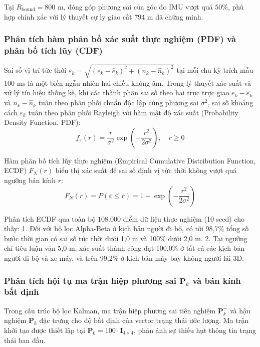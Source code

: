 Tại $R_{\text{bound}} = 800$ m, đóng góp phương sai của góc đo IMU vượt quá 50\%, phù hợp chính xác với lý thuyết cự ly giao cắt 794 m đã chứng minh.

\subsubsection{Phân tích hàm phân bố xác suất thực nghiệm (PDF) và phân bố tích lũy (CDF)}

\hspace{0.5cm} Sai số vị trí tức thời $\varepsilon_k = \sqrt{(e_k - \hat{e}_k)^2 + (n_k - \hat{n}_k)^2}$ tại mỗi chu kỳ trích mẫu 100 ms là một biến ngẫu nhiên hai chiều không âm. Trong lý thuyết xác suất và xử lý tín hiệu thống kê, khi các thành phần sai số theo hai trục trực giao $e_k - \hat{e}_k$ và $n_k - \hat{n}_k$ tuân theo phân phối chuẩn độc lập cùng phương sai $\sigma^2$, sai số khoảng cách $\varepsilon_k$ tuân theo phân phối Rayleigh với hàm mật độ xác suất (Probability Density Function, PDF):
\begin{equation}
f_{\varepsilon}(r) = \frac{r}{\sigma^2} \exp\left(-\frac{r^2}{2\sigma^2}\right), \quad r \ge 0
\label{eq:rayleigh-pdf}
\end{equation}

Hàm phân bố tích lũy thực nghiệm (Empirical Cumulative Distribution Function, ECDF) $F_N(r)$ biểu thị xác suất để sai số định vị tức thời không vượt quá ngưỡng bán kính $r$:
\begin{equation}
F_N(r) = P(\varepsilon \le r) = 1 - \exp\left(-\frac{r^2}{2\sigma^2}\right)
\label{eq:ecdf-formula}
\end{equation}

Phân tích ECDF qua toàn bộ $108.000$ điểm dữ liệu thực nghiệm (10 seed) cho thấy:
1. Đối với bộ lọc Alpha-Beta ở kịch bản người đi bộ, có tới 98,7\% tổng số bước thời gian có sai số tức thời dưới 1,0 m và 100\% dưới 2,0 m.
2. Tại ngưỡng chỉ tiêu luận văn 5,0 m, xác suất thành công đạt 100,0\% ở tất cả các kịch bản người đi bộ và xe máy, và trên 99,2\% ở kịch bản máy bay không người lái 3D.

\subsubsection{Phân tích hội tụ ma trận hiệp phương sai \texorpdfstring{$\mathbf{P}_k$}{Pk} và bán kính bất định}

\hspace{0.5cm} Trong cấu trúc bộ lọc Kalman, ma trận hiệp phương sai tiên nghiệm $\mathbf{P}_k^-$ và hậu nghiệm $\mathbf{P}_k$ đặc trưng cho độ bất định của vector trạng thái ước lượng. Ma trận khởi tạo được thiết lập tại $\mathbf{P}_0 = 100 \cdot \mathbf{I}_{4 \times 4}$, phản ánh sự thiếu hụt thông tin trạng thái ban đầu.


